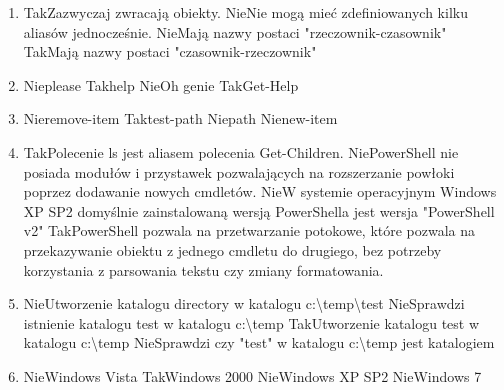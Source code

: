 \begin{enumerate}
		\newpage
		\item {}%
		{Tak}{Zazwyczaj zwracają obiekty.}%
		{Nie}{Nie mogą mieć zdefiniowanych kilku aliasów jednocześnie.}%
		{Nie}{Mają nazwy postaci "rzeczownik-czasownik"}%
		{Tak}{Mają nazwy postaci "czasownik-rzeczownik"}
		\item {}%
		{Nie}{please}%
		{Tak}{help}%
		{Nie}{Oh genie}%
		{Tak}{Get-Help}
		\item {}%
		{Nie}{remove-item}%
		{Tak}{test-path}%
		{Nie}{path}%
		{Nie}{new-item}
		\item {}%
		{Tak}{Polecenie ls jest aliasem polecenia Get-Children.}%
		{Nie}{PowerShell nie posiada modułów i przystawek pozwalających na rozszerzanie powłoki poprzez dodawanie nowych cmdletów.}%
		{Nie}{W systemie operacyjnym Windows XP SP2 domyślnie zainstalowaną wersją PowerShella jest wersja "PowerShell v2"}%
		{Tak}{PowerShell pozwala na przetwarzanie potokowe, które pozwala na przekazywanie obiektu z jednego cmdletu do drugiego, bez potrzeby korzystania z parsowania tekstu czy zmiany formatowania.}
		\item {}%
		{Nie}{Utworzenie katalogu directory w katalogu c:\textbackslash temp\textbackslash test}%
		{Nie}{Sprawdzi istnienie katalogu test w katalogu c:\textbackslash temp}%
		{Tak}{Utworzenie katalogu test w katalogu c:\textbackslash temp}%
		{Nie}{Sprawdzi czy "test" w katalogu c:\textbackslash temp jest katalogiem}
		\item {}%
		{Nie}{Windows Vista}%
		{Tak}{Windows 2000}%
		{Nie}{Windows XP SP2}%
		{Nie}{Windows 7}
		

\end{enumerate}

